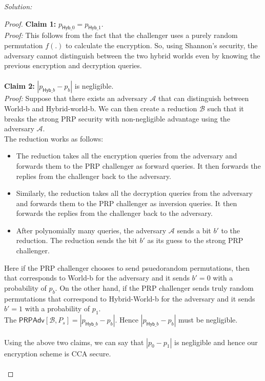 \documentclass[a4paper, 11pt]{article}
\newenvironment{solution}
    {\textit{Solution:}}
    {\clearpage}
\newcommand{\hyb}{\mathsf{Hyb}}
\newcommand{\calA}{\mathcal{A}}
\newcommand{\calB}{\mathcal{B}}
\begin{document}
\begin{solution}
\begin{enumerate}[(a)]
\begin{proof}
                  \textbf{Claim 1:} $p_{\hyb\_0} = p_{\hyb\_1}$. \\
                  \textit{Proof:} This follows from the fact that the challenger uses a purely random permutation $f(.)$ to calculate the encryption. So, using Shannon's security, the adversary cannot distinguish between the two hybrid worlds even by knowing the previous encryption and decryption queries. \\ \\

                  \textbf{Claim 2:} $|p_{\hyb\_b} - p_b|$ is negligible. \\
                  \textit{Proof:} Suppose that there exists an adversary $\calA$ that can distinguish between World-b and Hybrid-world-b. We can then create a reduction $\calB$ such that it breaks the strong PRP security with non-negligible advantage using the adversary $\calA$.\\
                  The reduction works as follows:
                  \begin{itemize}
                      \item The reduction takes all the encryption queries from the adversary and forwards them to the PRP challenger as forward queries. It then forwards the replies from the challenger back to the adversary.
                      \item Similarly, the reduction takes all the decryption queries from the adversary and forwards them to the PRP challenger as inversion queries. It then forwards the replies from the challenger back to the adversary.
                      \item After polynomially many queries, the adversary $\calA$ sends a bit $b'$ to the reduction. The reduction sends the bit $b'$ as its guess to the strong PRP challenger.
                  \end{itemize}
                  Here if the PRP challenger chooses to send psuedorandom permutations, then that corresponds to World-b for the adversary and it sends $b' = 0$ with a probability of $p_b$. On the other hand, if the PRP challenger sends truly random permutations that correspond to Hybrid-World-b for the adversary and it sends $b' = 1$ with a probability of $p_1$. \\
                  The $\mathsf{PRPAdv}[\calB, P_s] = |p_{\hyb\_b} - p_b|$. Hence $|p_{\hyb\_b} - p_b|$ must be negligible.\\ \\
                  Using the above two claims, we can say that $|p_0 - p_1|$ is negligible and hence our encryption scheme is CCA secure.
                  \\ \\
              \end{proof}

    \end{enumerate}

\end{solution}
\end{document}
